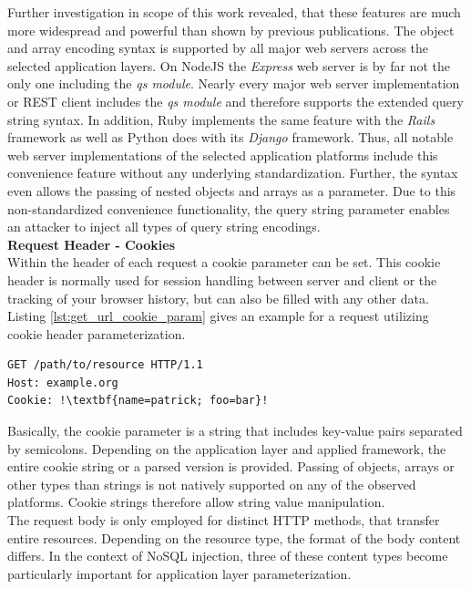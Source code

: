 Further investigation in scope of this work revealed, that these features are much more widespread and powerful than shown by previous publications. The object and array encoding syntax is supported by all major web servers across the selected application layers. On NodeJS the \textit{Express} web server is by far not the only one including the \textit{qs module}. Nearly every major web server implementation or REST client includes the \textit{qs module} and therefore supports the extended query string syntax. In addition, Ruby implements the same feature with the \textit{Rails} framework as well as Python does with its \textit{Django} framework. Thus, all notable web server implementations of the selected application platforms include this convenience feature without any underlying standardization. Further, the syntax even allows the passing of nested objects and arrays as a parameter. Due to this non-standardized convenience functionality, the query string parameter enables an attacker to inject all types of query string encodings. \\

\textbf{Request Header - Cookies}\\
Within the header of each request a cookie parameter can be set. This cookie header is normally used for session handling between server and client or the tracking of your browser history, but can also be filled with any other data. Listing \ref{lst:get_url_cookie_param} gives an example for a request utilizing cookie header parameterization. \\

\begin{lstlisting}[escapechar=!, caption={Example for GET request with cookie header parameterization}, label={lst:get_url_cookie_param}]
GET /path/to/resource HTTP/1.1
Host: example.org
Cookie: !\textbf{name=patrick; foo=bar}!
\end{lstlisting}

Basically, the cookie parameter is a string that includes key-value pairs separated by semicolons. Depending on the application layer and applied framework, the entire cookie string or a parsed version is provided. Passing of objects, arrays or other types than strings is not natively supported on any of the observed platforms. Cookie strings therefore allow string value manipulation. \\

The request body is only employed for distinct HTTP methods, that transfer entire resources. Depending on the resource type, the format of the body content differs. In the context of NoSQL injection, three of these content types become particularly important for application layer parameterization. \\

